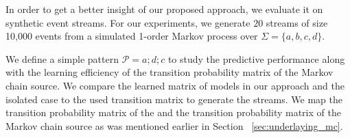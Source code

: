 \par In order to get a better insight of our proposed approach, we evaluate it on synthetic event streams. For our experiments, we generate $20$ streams of size 10,000 events from a simulated 1-order Markov process over $\Sigma=\{a, b, c, d\}$.

\par We define a simple pattern $\mathcal{P}=a ; d ; c$ to study the predictive performance along with the learning efficiency of the transition probability matrix of the Markov chain source.  We compare the learned matrix of \pmcmr models in our approach and the isolated case to the used transition matrix to generate the streams. We map the transition probability matrix of the \pmcmr and the transition probability matrix of the Markov chain source as was mentioned earlier in Section ~\ref{sec:underlaying_mc}.
   


